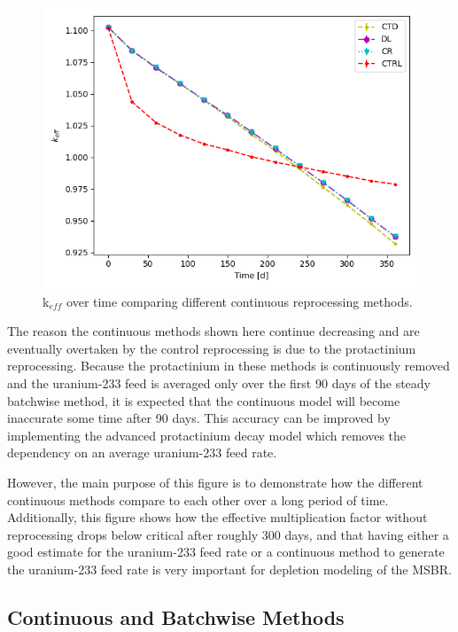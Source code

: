 \begin{figure}[H]
  \centering
  \includegraphics[scale=0.7]{images/cont-compare-keff-1.png}
  \caption{k$_{eff}$ over time comparing different continuous reprocessing methods.}
   \label{fig:continuous-compare}
\end{figure}

The reason the continuous methods shown here continue decreasing and are eventually overtaken by the control reprocessing is due to the protactinium reprocessing. Because the protactinium in these methods is continuously removed and the uranium-233 feed is averaged only over the first 90 days of the steady batchwise method, it is expected that the continuous model will become inaccurate some time after 90 days. This accuracy can be improved by implementing the advanced protactinium decay model which removes the dependency on an average uranium-233 feed rate.

However, the main purpose of this figure is to demonstrate how the different continuous methods compare to each other over a long period of time. Additionally, this figure shows how the effective multiplication factor without reprocessing drops below critical after roughly 300 days, and that having either a good estimate for the uranium-233 feed rate or a continuous method to generate the uranium-233 feed rate is very important for depletion modeling of the MSBR.


\subsection{Continuous and Batchwise Methods}

